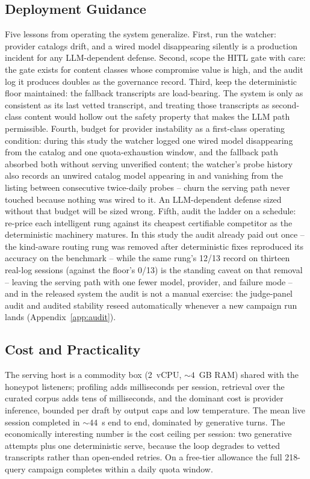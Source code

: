 \subsection{Deployment Guidance}
Five lessons from operating the system generalize. First, run the
watcher: provider catalogs drift, and a wired model disappearing silently
is a production incident for any LLM-dependent defense. Second, scope the
HITL gate with care: the gate exists for content classes whose
compromise value is high, and the audit log it produces doubles as the
governance record. Third, keep the deterministic floor maintained: the
fallback transcripts are load-bearing. The system is only as consistent
as its last vetted transcript, and treating those transcripts as second-class
content would hollow out the safety property that makes the LLM path
permissible. Fourth, budget for provider instability as a first-class
operating condition: during this study the watcher logged one wired model
disappearing from the catalog and one quota-exhaustion window, and the
fallback path absorbed both without serving unverified content; the
watcher's probe history also records an unwired catalog model appearing
in and vanishing from the listing between consecutive twice-daily
probes -- churn the serving path never touched because nothing was
wired to it. An
LLM-dependent defense sized without that budget will be sized wrong.
Fifth, audit the ladder on a schedule: re-price each intelligent rung
against its cheapest certifiable competitor as the deterministic
machinery matures. In this study the audit already paid out once --the kind-aware routing rung was removed after deterministic fixes reproduced
its accuracy on the benchmark -- while the same rung's 12/13 record on
thirteen real-log sessions (against the floor's 0/13) is the standing
caveat on that removal -- leaving the serving path with one fewer model,
provider, and failure mode -- and in the released system the audit is
not a manual exercise: the judge-panel audit and audited stability
reseed automatically whenever a new campaign run lands (Appendix~\ref{app:audit}).

\subsection{Cost and Practicality}
The serving host is a commodity box (2~vCPU, ${\sim}4$~GB RAM) shared with
the honeypot listeners; profiling adds milliseconds per session, retrieval
over the curated corpus adds tens of milliseconds, and the dominant cost is
provider inference, bounded per draft by output caps and low temperature.
The mean live session completed in ${\sim}44$~s end to end, dominated by
generative turns. The economically interesting number is the cost ceiling
per session: two generative attempts plus one deterministic serve, because
the loop degrades to vetted transcripts rather than open-ended retries. On
a free-tier allowance the full 218-query campaign completes within a daily
quota window.

